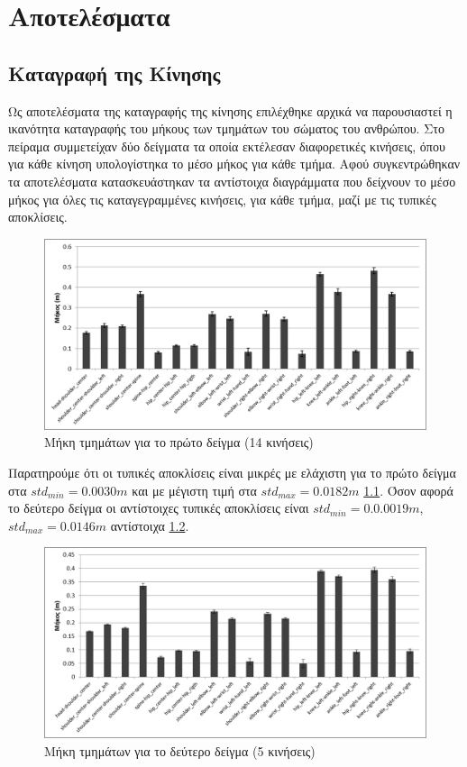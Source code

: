 \chapter{Αποτελέσματα}

\section{Καταγραφή της Κίνησης}

Ως αποτελέσματα της καταγραφής της κίνησης επιλέχθηκε αρχικά να παρουσιαστεί η ικανότητα καταγραφής του μήκους των τμημάτων του σώματος του ανθρώπου. Στο πείραμα συμμετείχαν δύο δείγματα τα οποία εκτέλεσαν διαφορετικές κινήσεις, όπου για κάθε κίνηση υπολογίστηκα το μέσο μήκος για κάθε τμήμα. Αφού συγκεντρώθηκαν τα αποτελέσματα κατασκευάστηκαν τα αντίστοιχα διαγράμματα που δείχνουν το μέσο μήκος για όλες τις καταγεγραμμένες κινήσεις, για κάθε τμήμα, μαζί με τις τυπικές αποκλίσεις.

\begin{figure}[H]
    \centering
    \includegraphics[width=.9\textwidth]{fig/subject01-segments.png}
    \caption{Μήκη τμημάτων για το πρώτο δείγμα (14 κινήσεις)}
    \label{fig:subject01-segments}
\end{figure}

Παρατηρούμε ότι οι τυπικές αποκλίσεις είναι μικρές με ελάχιστη για το πρώτο δείγμα στα $std_{min} = 0.0030m$ και με μέγιστη τιμή στα $std_{max} = 0.0182m$ \ref{fig:subject01-segments}. Όσον αφορά το δεύτερο δείγμα οι αντίστοιχες τυπικές αποκλίσεις είναι $std_{min} = 0.0.0019m$, $std_{max} = 0.0146m$ αντίστοιχα \ref{fig:subject02-segments}.

\begin{figure}[H]
    \centering
    \includegraphics[width=.9\textwidth]{fig/subject02-segments.png}
    \caption{Μήκη τμημάτων για το δεύτερο δείγμα (5 κινήσεις)}
    \label{fig:subject02-segments}
\end{figure}

